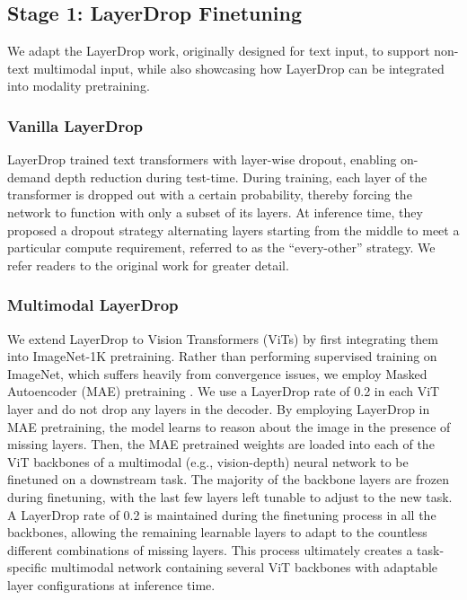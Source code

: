 \subsection{Stage 1: LayerDrop Finetuning}

We adapt the LayerDrop \cite{fan2019reducing} work, originally designed for text input, to support non-text multimodal input, while also showcasing how LayerDrop can be integrated into modality pretraining. 


\subsubsection{Vanilla LayerDrop}
LayerDrop trained text transformers with layer-wise dropout, enabling on-demand depth reduction during test-time. During training, each layer of the transformer is dropped out with a certain probability, thereby forcing the network to function with only a subset of its layers. At inference time, they proposed a dropout strategy alternating layers starting from the middle to meet a particular compute requirement, referred to as the ``every-other'' strategy. We refer readers to the original work for greater detail.


\subsubsection{Multimodal LayerDrop}
We extend LayerDrop to Vision Transformers (ViTs) \cite{dosovitskiy2020image} by first integrating them into ImageNet-1K \cite{ILSVRC15} pretraining. Rather than performing supervised training on ImageNet, which suffers heavily from convergence issues, we employ Masked Autoencoder (MAE) pretraining \cite{he2022masked}. We use a LayerDrop rate of 0.2 in each ViT layer and do not drop any layers in the decoder. By employing LayerDrop in MAE pretraining, the model learns to reason about the image in the presence of missing layers. Then, the MAE pretrained weights are loaded into each of the ViT backbones of a multimodal (e.g., vision-depth) neural network to be finetuned on a downstream task. The majority of the backbone layers are frozen during finetuning, with the last few layers left tunable to adjust to the new task. A LayerDrop rate of 0.2 is maintained during the finetuning process in all the backbones, allowing the remaining learnable layers to adapt to the countless different combinations of missing layers. This process ultimately creates a task-specific multimodal network containing several ViT backbones with adaptable layer configurations at inference time. 


